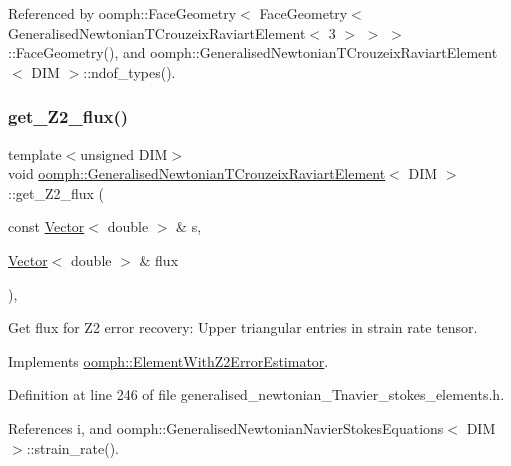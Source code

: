 Referenced by oomph\+::\+Face\+Geometry$<$ Face\+Geometry$<$ Generalised\+Newtonian\+T\+Crouzeix\+Raviart\+Element$<$ 3 $>$ $>$ $>$\+::\+Face\+Geometry(), and oomph\+::\+Generalised\+Newtonian\+T\+Crouzeix\+Raviart\+Element$<$ D\+I\+M $>$\+::ndof\+\_\+types().

\mbox{\label{classoomph_1_1GeneralisedNewtonianTCrouzeixRaviartElement_af41b2ba4e62e9025ca751e79ee570901}} 
\subsubsection{\texorpdfstring{get\+\_\+\+Z2\+\_\+flux()}{get\_Z2\_flux()}}
{\footnotesize\ttfamily template$<$unsigned D\+IM$>$ \\
void \hyperlink{classoomph_1_1GeneralisedNewtonianTCrouzeixRaviartElement}{oomph\+::\+Generalised\+Newtonian\+T\+Crouzeix\+Raviart\+Element}$<$ D\+IM $>$\+::get\+\_\+\+Z2\+\_\+flux (\begin{DoxyParamCaption}\item[{const \hyperlink{classoomph_1_1Vector}{Vector}$<$ double $>$ \&}]{s,  }\item[{\hyperlink{classoomph_1_1Vector}{Vector}$<$ double $>$ \&}]{flux }\end{DoxyParamCaption})\hspace{0.3cm}{\ttfamily [inline]}, {\ttfamily [virtual]}}



Get \textquotesingle{}flux\textquotesingle{} for Z2 error recovery\+: Upper triangular entries in strain rate tensor. 



Implements \hyperlink{classoomph_1_1ElementWithZ2ErrorEstimator_a5688ff5f546d81771cabad82ca5a7556}{oomph\+::\+Element\+With\+Z2\+Error\+Estimator}.



Definition at line 246 of file generalised\+\_\+newtonian\+\_\+\+Tnavier\+\_\+stokes\+\_\+elements.\+h.



References i, and oomph\+::\+Generalised\+Newtonian\+Navier\+Stokes\+Equations$<$ D\+I\+M $>$\+::strain\+\_\+rate().

